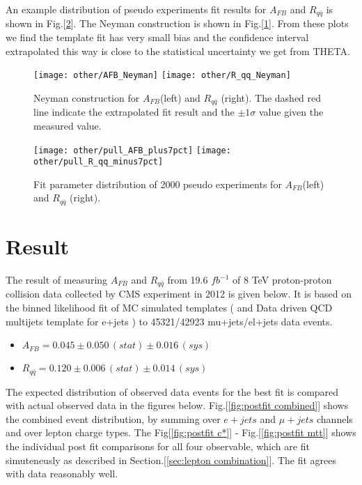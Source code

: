 \documentclass{cmspaperpdf}
\begin{document}
An example distribution of pseudo experiments fit results for $A_{FB}$ and $R_{q\bar{q}}$ is shown in Fig.[\ref{fig:pseudo-ex}]. The Neyman construction is shown in Fig.[\ref{fig:neyman}]. From these plots we find the template fit has very small bias and the confidence interval extrapolated this way is close to the statistical uncertainty we get from THETA. 

\begin{figure}[hbt]
  \begin{center}
    \texttt{[image: other/AFB\_Neyman]}
    \texttt{[image: other/R\_qq\_Neyman]}
  \caption{\small Neyman construction for $A_{FB}$(left) and $R_{q\bar q}$ (right). The dashed red line indicate the extrapolated fit result and the $\pm 1 \sigma$ value given the measured value. }
    \label{fig:neyman}
  \end{center}
\end{figure}

\begin{figure}[hbt]
  \begin{center}
    \texttt{[image: other/pull\_AFB\_plus7pct]}
    \texttt{[image: other/pull\_R\_qq\_minus7pct]}
  \caption{\small Fit parameter distribution of 2000 pseudo experiments for $A_{FB}$(left) and $R_{q\bar q}$ (right).}
    \label{fig:pseudo-ex}
  \end{center}
\end{figure}


\clearpage
\section{Result}
\label{sec:results}

The result of measuring $A_{FB}$ and $R_{q\bar{q}}$ from 19.6 $fb^{-1}$ of 8 TeV proton-proton collision data collected by CMS experiment in 2012 is given below. It is based on the binned likelihood fit of MC simulated templates ( and Data driven QCD multijets template for e+jets ) to 45321/42923 mu+jets/el+jets data events. 
\begin{itemize}
\item $ A_{FB} = 0.045  \pm 0.050 \, (stat) \pm 0.016 \, (sys)$

\item $ R_{q\bar{q}} = 0.120  \pm 0.006 \, (stat) \pm 0.014 \, (sys) $
\end{itemize}


The expected distribution of observed data events for the best fit is compared with actual observed data in the figures below. Fig.[\ref{fig:postfit combined}] shows the combined event distribution, by summing over $e+jets$ and $\mu+jets$ channels and over lepton charge types. The Fig[\ref{fig:postfit c*}] - Fig.[\ref{fig:postfit mtt}] shows the individual post fit comparisons for all four observable, which are fit simuteneusly as described in Section.[\ref{sec:lepton combination}]. The fit agrees with data reasonably well. 
\end{document}
